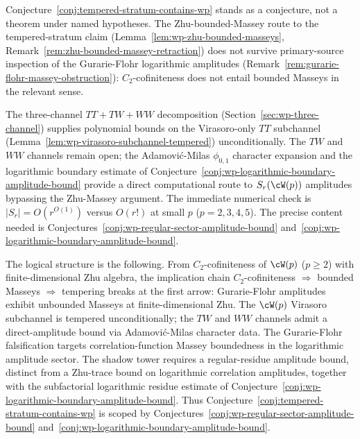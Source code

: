 \begin{remark}
\label{rem:wp-tempering-scope}
Conjecture~\ref{conj:tempered-stratum-contains-wp} stands as a
conjecture, not a theorem under named hypotheses. The Zhu-bounded-Massey
route to the tempered-stratum claim
(Lemma~\ref{lem:wp-zhu-bounded-masseys},
Remark~\ref{rem:zhu-bounded-massey-retraction}) does not survive
primary-source inspection of the Gurarie-Flohr logarithmic amplitudes
(Remark~\ref{rem:gurarie-flohr-massey-obstruction}):
$C_2$-cofiniteness does not entail bounded Masseys in the relevant
sense.

The three-channel $TT + TW + WW$ decomposition
(Section~\ref{sec:wp-three-channel}) supplies polynomial bounds on the
Virasoro-only $TT$ subchannel
(Lemma~\ref{lem:wp-virasoro-subchannel-tempered}) unconditionally. The
$TW$ and $WW$ channels remain open; the Adamovi\'c-Milas
$\phi_{0,1}$ character expansion and the logarithmic boundary estimate
of Conjecture~\ref{conj:wp-logarithmic-boundary-amplitude-bound}
provide a direct computational route to $S_r(\cW(p))$ amplitudes
bypassing the Zhu-Massey argument. The immediate numerical check is
$\lvert S_r \rvert = O(r^{O(1)})$ versus $O(r!)$ at small $p$
($p = 2, 3, 4, 5$). The precise content needed is
Conjectures~\ref{conj:wp-regular-sector-amplitude-bound}
and~\ref{conj:wp-logarithmic-boundary-amplitude-bound}.

The logical structure is the following. From $C_2$-cofiniteness of
$\cW(p)$ ($p \ge 2$) with finite-dimensional Zhu algebra, the
implication chain $C_2$-cofiniteness $\Rightarrow$ bounded Masseys
$\Rightarrow$ tempering breaks at the first arrow: Gurarie-Flohr
amplitudes exhibit unbounded Masseys at finite-dimensional Zhu. The
$\cW(p)$ Virasoro subchannel is tempered unconditionally; the $TW$
and $WW$ channels admit a direct-amplitude bound via Adamovi\'c-Milas
character data. The Gurarie-Flohr falsification targets
correlation-function Massey boundedness in the logarithmic amplitude
sector. The shadow tower requires a regular-residue amplitude bound,
distinct from a Zhu-trace bound on logarithmic correlation amplitudes,
together with the subfactorial logarithmic residue estimate of
Conjecture~\ref{conj:wp-logarithmic-boundary-amplitude-bound}. Thus
Conjecture~\ref{conj:tempered-stratum-contains-wp} is scoped by
Conjectures~\ref{conj:wp-regular-sector-amplitude-bound}
and~\ref{conj:wp-logarithmic-boundary-amplitude-bound}.
\end{remark}


